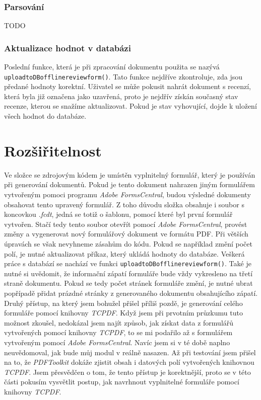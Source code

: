 \documentclass[czech,BP]{thesiskiv}
\begin{document}
\subsection{Parsování}
TODO
\subsection{Aktualizace hodnot v databázi}
\sloppy
Poslední funkce, která je při zpracování dokumentu použita se nazývá \texttt{upload\textunderscore to\textunderscore DB\textunderscore offline\textunderscore review\textunderscore form()}. Tato funkce nejdříve zkontroluje, zda jsou předané hodnoty korektní. Uživatel se může pokusit nahrát dokument s recenzí, která byla již označena jako uzavřená, proto je nejdřív získán současný stav recenze, kterou se snažíme aktualizovat. Pokud je stav vyhovující, dojde k uložení všech hodnot do databáze. 
\chapter{Rozšiřitelnost}
Ve složce se zdrojovým kódem je umístěn vyplnitelný formulář, který je používán při generování dokumentů. Pokud je tento dokument nahrazen jiným formulářem vytvořeným pomoci programu \emph{Adobe FormsCentral}, budou výsledné dokumenty obsahovat tento upravený formulář. Z toho důvodu složka obsahuje i soubor s koncovkou \emph{.fcdt}, jedná se totiž o šablonu, pomocí které byl první formulář vytvořen. Stačí tedy tento soubor otevřít pomocí \emph{Adobe FormsCentral}, provést změny a vygenerovat nový formulářový dokument ve formátu PDF. 
\sloppy
Při větších úpravách se však nevyhneme zásahům do kódu. Pokud se například změní počet polí, je nutné aktualizovat příkaz, který ukládá hodnoty do databáze. Veškerá práce s databází se nachází ve funkci \texttt{upload\textunderscore to\textunderscore DB\textunderscore offline\textunderscore review\textunderscore form()}. Také je nutné si uvědomit, že informační zápatí formuláře bude vždy vykresleno na třetí straně dokumentu. Pokud se tedy počet stránek formuláře změní, je nutné ubrat popřípadě přidat prázdné stránky z generovaného dokumentu obsahujícího zápatí.
Druhý přístup, na který jsem bohužel přišel příliš pozdě, je generování celého formuláře pomocí knihovny \emph{TCPDF}. Když jsem při prvotním průzkumu tuto možnost zkoušel, nedokázal jsem najít způsob, jak získat data z formulářů vytvořených pomocí knihovny \emph{TCPDF}, to se mi podařilo až s formulářem vytvořeným pomocí \emph{Adobe FormsCentral}. Navíc jsem si v té době naplno neuvědomoval, jak bude můj modul v reálně nasazen. Až při testování jsem přišel na to, že \emph{PDFToolkit} dokáže zjistit obsah i datových polí vytvořených knihovnou \emph{TCPDF}. Jsem přesvědčen o tom, že tento přístup je korektnější, proto se v této části pokusím vysvětlit postup, jak navrhnout vyplnitelné formuláře pomocí knihovny \emph{TCPDF}.
\end{document}
